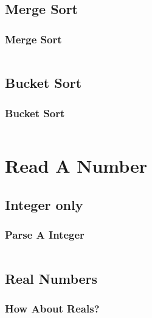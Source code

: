 \documentclass[en, 11pt, xcolor=dvipsnames]{beamer}
\begin{document}
\subsection{Merge Sort}
\begin{frame}[fragile]
	\frametitle{Merge Sort}



	\begin{columns}[c]
		\begin{column}{0.98\textwidth}

		\end{column}
	\end{columns}
\end{frame}

\subsection{Bucket Sort}
\begin{frame}[fragile]
	\frametitle{Bucket Sort}




	\begin{columns}[c]
		\begin{column}{0.98\textwidth}

		\end{column}
	\end{columns}
\end{frame}


\section{Read A Number}
\subsection{Integer only}
\begin{frame}[fragile]
	\frametitle{Parse A Integer}


	\begin{columns}[c]
		\begin{column}{0.98\textwidth}

		\end{column}
	\end{columns}
\end{frame}

\subsection{Real Numbers}
\begin{frame}[fragile]
	\frametitle{How About Reals?}



	\begin{columns}[c]
		\begin{column}{0.98\textwidth}

		\end{column}
	\end{columns}

\end{frame}
\end{document}
